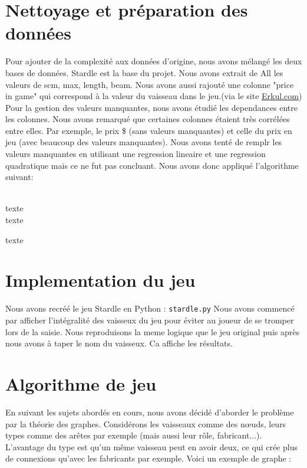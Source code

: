 \documentclass{article}
\begin{document}
\section{Nettoyage et préparation des données}

Pour ajouter de la complexité aux données d'origine, nous avons mélangé les deux bases de données.
Stardle est la base du projet. Nous avons extrait de All les valeurs de scm, max, length, beam. Nous avons aussi 
rajouté une colonne "price in game" qui correspond à la valeur du vaisseau dans le jeu.(via le site 
\href{https://www.erkul.games/live/calculator}{Erkul.com})\\

Pour la gestion des valeurs manquantes, nous avons étudié les dependances entre les colonnes.
Nous avons remarqué que certaines colonnes étaient très corrélées entre elles. Par exemple, le prix \$ (sans valeurs manquantes) 
et celle du prix en jeu (avec beaucoup des valeurs manquantes). Nous avons tenté de remplr les valeurs manquantes
en utilisant une regression lineaire et une regression quadratique mais ce ne fut pas concluant. 
Nous avons donc appliqué l'algorithme suivant: \\
\\

\begin{algorithm}[H]
    \SetAlgoLined
    texte\\
    texte\;
    \caption{texte}
    \end{algorithm}


\section{Implementation du jeu}

Nous avons recréé le jeu Stardle en Python : \verb|stardle.py|
Nous avons commencé par afficher l'intégralité des vaisseux du jeu pour éviter au joueur de se tromper
lors de la saisie.
Nous reproduisons la meme logique que le jeu original
puis après nous avons à taper le nom du vaisseux. Ca affiche les résultats.

\section{Algorithme de jeu}

En suivant les sujets abordés en cours, nous avons décidé d'aborder le problème par la théorie des graphes.
Considérons les vaisseaux comme des nœuds, leurs types comme des arêtes par exemple (mais aussi leur rôle, fabricant...).
L'avantage du type est qu'un même vaisseau peut en avoir deux, ce qui crée plus de connexions qu'avec 
les fabricants par exemple.
Voici un exemple de graphe : 
\end{document}
